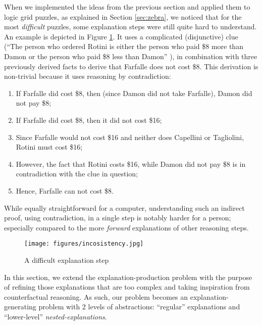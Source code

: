 When we implemented the ideas from the previous section and applied them to logic grid puzzles, as explained in Section \ref{sec:zebra}, we noticed that 
for the most \textit{difficult} puzzles, some explanation steps were still quite hard to understand.
An example is depicted in Figure \ref{fig:pasta_diff}.
It uses a complicated (disjunctive) clue (``The person who ordered Rotini is either the person who paid \$8 more than Damon or the person who paid \$8 less than Damon'' ), in combination with three previously derived facts to derive that Farfalle does not cost \$8.
This derivation is non-trivial because it uses reasoning by contradiction:
 \begin{enumerate}
  \item If Farfalle did cost \$8, then (since Damon did not take Farfalle), Damon did not pay \$8;
  \item If Farfalle did cost \$8, then it did not cost \$16; 
  \item Since Farfalle would not cost \$16 and neither does Capellini or Tagliolini, Rotini must cost \$16;
  \item However, the fact that Rotini costs \$16, while Damon did not pay \$8 is in contradiction with the clue in question;
  \item Hence, Farfalle can not cost \$8.
 \end{enumerate}
 While equally straightforward for a computer, understanding such an indirect proof, using contradiction, in a single step is notably harder for a person; especially compared to the more \textit{forward} explanations of other reasoning steps.
\begin{figure}[t!]
    \texttt{[image: figures/incosistency.jpg]}
    \caption{A difficult explanation step}\label{fig:pasta_diff}
\end{figure}

In this section, we extend the explanation-production problem with the purpose of refining those explanations that are too complex and taking inspiration from counterfactual reasoning.
As such, our problem becomes an explanation-generating problem with 2 levels of abstractions: ``regular'' explanations and ``lower-level'' \textit{nested-explanations}. 

